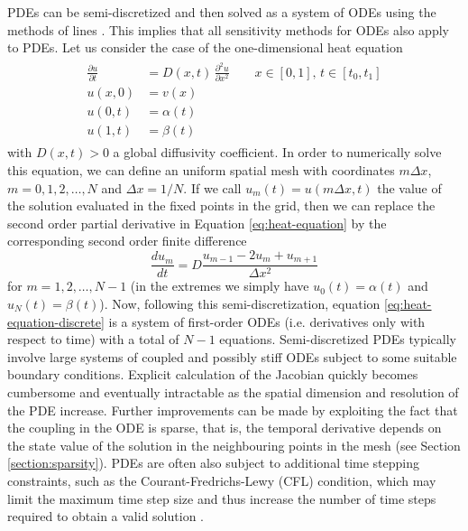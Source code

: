 PDEs can be semi-discretized and then solved as a system of ODEs using the methods of lines \cite{ascher2008numerical}. 
This implies that all sensitivity methods for ODEs also apply to PDEs. 
Let us consider the case of the one-dimensional heat equation
\begin{align}
\begin{split}
 \frac{\partial u}{\partial t}
 &= 
 D(x,t) \, 
 \frac{\partial^2 u}{\partial x^2} \qquad x \in [0,1], \, t \in [t_0, t_1]\\
 u(x, 0) &= v(x) \\
 u(0, t) &= \alpha(t) \\
 u(1, t) &= \beta(t)
 \label{eq:heat-equation}
\end{split}
\end{align}
with $D(x, t) > 0$ a global diffusivity coefficient.
In order to numerically solve this equation, we can define an uniform spatial mesh with coordinates $m \Delta x$, $m=0, 1, 2, \ldots, N$ and $\Delta x = 1 / N$.
If we call $u_m(t) = u(m \Delta x, t)$ the value of the solution evaluated in the fixed points in the grid, then we can replace the second order partial derivative in Equation \eqref{eq:heat-equation} by the corresponding second order finite difference
\begin{equation}
 \frac{d u_m}{dt} 
 = 
 D 
 \frac{u_{m-1} - 2u_m + u_{m+1}}{\Delta x^2}
 \label{eq:heat-equation-discrete}
\end{equation}
for $m = 1, 2, \ldots, N-1$ (in the extremes we simply have $u_0(t) = \alpha(t)$ and $u_N(t)=\beta(t)$).
Now, following this semi-discretization, equation \eqref{eq:heat-equation-discrete} is a system of first-order ODEs  (i.e. derivatives only with respect to time) with a total of $N-1$ equations.
Semi-discretized PDEs typically involve large systems of coupled and possibly stiff ODEs subject to some suitable boundary conditions. 
Explicit calculation of the Jacobian quickly becomes cumbersome and eventually intractable as the spatial dimension and resolution of the PDE increase.
Further improvements can be made by exploiting the fact that the coupling in the ODE is sparse, that is, the temporal derivative depends on the state value of the solution in the neighbouring points in the mesh (see Section \ref{section:sparsity}).
PDEs are often also subject to additional time stepping constraints, such as the Courant-Fredrichs-Lewy (CFL) condition, which may limit the maximum time step size and thus increase the number of time steps required to obtain a valid solution \cite{courantPartialDifferenceEquations1967}. 

